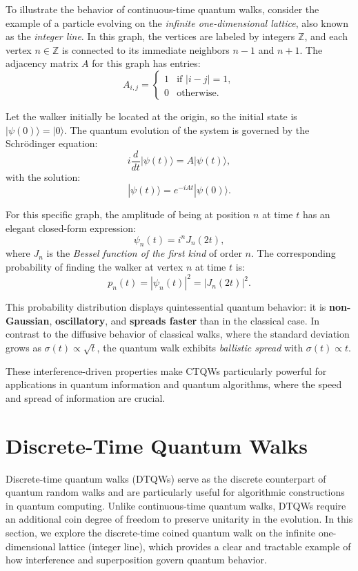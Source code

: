 \documentclass[11pt]{article}
\theoremstyle{definition}
\begin{document}
To illustrate the behavior of continuous-time quantum walks, consider the example of a particle evolving on the \textit{infinite one-dimensional lattice}, also known as the \textit{integer line}. In this graph, the vertices are labeled by integers \( \mathbb{Z} \), and each vertex \( n \in \mathbb{Z} \) is connected to its immediate neighbors \( n-1 \) and \( n+1 \). The adjacency matrix \( A \) for this graph has entries:
\[
A_{i,j} =
\begin{cases}
1 & \text{if } |i - j| = 1, \\
0 & \text{otherwise}.
\end{cases}
\]

Let the walker initially be located at the origin, so the initial state is \( |\psi(0)\rangle = |0\rangle \). The quantum evolution of the system is governed by the Schrödinger equation:
\[
i \frac{d}{dt} |\psi(t)\rangle = A |\psi(t)\rangle,
\]
with the solution:
\[
|\psi(t)\rangle = e^{-iAt} |\psi(0)\rangle.
\]

For this specific graph, the amplitude of being at position \( n \) at time \( t \) has an elegant closed-form expression:
\[
\psi_n(t) = i^n J_n(2t),
\]
where \( J_n \) is the \textit{Bessel function of the first kind} of order \( n \). The corresponding probability of finding the walker at vertex \( n \) at time \( t \) is:
\[
p_n(t) = |\psi_n(t)|^2 = |J_n(2t)|^2.
\]

This probability distribution displays quintessential quantum behavior: it is \textbf{non-Gaussian}, \textbf{oscillatory}, and \textbf{spreads faster} than in the classical case. In contrast to the diffusive behavior of classical walks, where the standard deviation grows as \( \sigma(t) \propto \sqrt{t} \), the quantum walk exhibits \textit{ballistic spread} with \( \sigma(t) \propto t \).

These interference-driven properties make CTQWs particularly powerful for applications in quantum information and quantum algorithms, where the speed and spread of information are crucial.




\section*{Discrete-Time Quantum Walks}



Discrete-time quantum walks (DTQWs) serve as the discrete counterpart of quantum random walks and are particularly useful for algorithmic constructions in quantum computing. Unlike continuous-time quantum walks, DTQWs require an additional coin degree of freedom to preserve unitarity in the evolution. In this section, we explore the discrete-time coined quantum walk on the infinite one-dimensional lattice (integer line), which provides a clear and tractable example of how interference and superposition govern quantum behavior.
\end{document}
